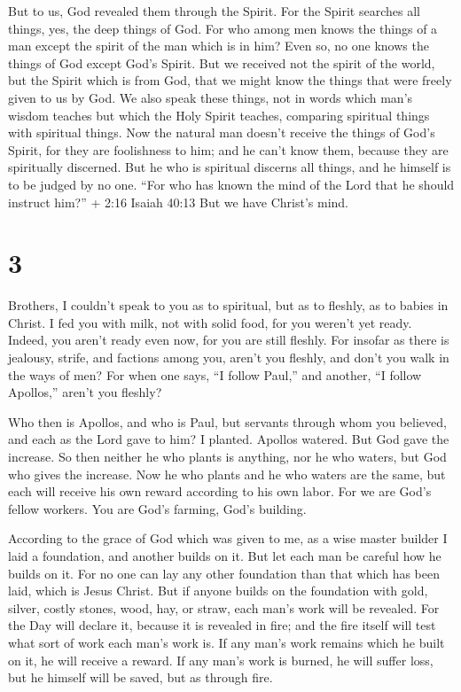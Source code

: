  But to us, God revealed them through the Spirit. For the
Spirit searches all things, yes, the deep things of God. 
For who among men knows the things of a man except the spirit of the man
which is in him? Even so, no one knows the things of God except God's
Spirit.  But we received not the spirit of the world, but
the Spirit which is from God, that we might know the things that were
freely given to us by God.  We also speak these things, not
in words which man's wisdom teaches but which the Holy Spirit teaches,
comparing spiritual things with spiritual things.  Now the
natural man doesn't receive the things of God's Spirit, for they are
foolishness to him; and he can't know them, because they are spiritually
discerned.  But he who is spiritual discerns all things,
and he himself is to be judged by no one.  ``For who has
known the mind of the Lord that he should instruct him?'' + 2:16 Isaiah
40:13 But we have Christ's mind.

\hypertarget{section-2}{%
\section{3}\label{section-2}}

 Brothers, I couldn't speak to you as to spiritual, but as
to fleshly, as to babies in Christ.  I fed you with milk,
not with solid food, for you weren't yet ready. Indeed, you aren't ready
even now,  for you are still fleshly. For insofar as there
is jealousy, strife, and factions among you, aren't you fleshly, and
don't you walk in the ways of men?  For when one says, ``I
follow Paul,'' and another, ``I follow Apollos,'' aren't you fleshly?

 Who then is Apollos, and who is Paul, but servants through
whom you believed, and each as the Lord gave to him?  I
planted. Apollos watered. But God gave the increase.  So
then neither he who plants is anything, nor he who waters, but God who
gives the increase.  Now he who plants and he who waters are
the same, but each will receive his own reward according to his own
labor.  For we are God's fellow workers. You are God's
farming, God's building.

 According to the grace of God which was given to me, as a
wise master builder I laid a foundation, and another builds on it. But
let each man be careful how he builds on it.  For no one
can lay any other foundation than that which has been laid, which is
Jesus Christ.  But if anyone builds on the foundation with
gold, silver, costly stones, wood, hay, or straw,  each
man's work will be revealed. For the Day will declare it, because it is
revealed in fire; and the fire itself will test what sort of work each
man's work is.  If any man's work remains which he built on
it, he will receive a reward.  If any man's work is burned,
he will suffer loss, but he himself will be saved, but as through fire.

